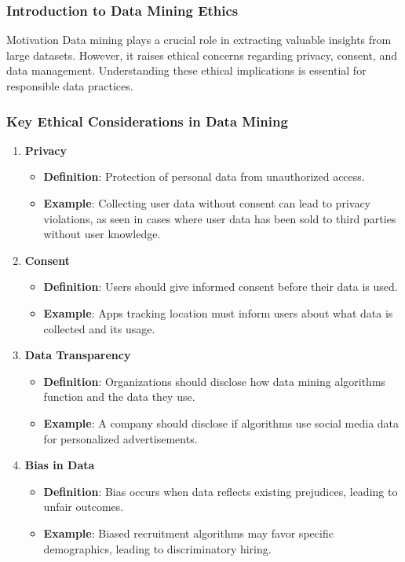 \documentclass[aspectratio=169]{beamer}
\begin{document}
\begin{frame}[fragile]
    \frametitle{Introduction to Data Mining Ethics}
    \begin{block}{Motivation}
        Data mining plays a crucial role in extracting valuable insights from large datasets. However, it raises ethical concerns regarding privacy, consent, and data management. Understanding these ethical implications is essential for responsible data practices.
    \end{block}
\end{frame}

\begin{frame}[fragile]
    \frametitle{Key Ethical Considerations in Data Mining}
    \begin{enumerate}
        \item \textbf{Privacy}
            \begin{itemize}
                \item \textbf{Definition}: Protection of personal data from unauthorized access.
                \item \textbf{Example}: Collecting user data without consent can lead to privacy violations, as seen in cases where user data has been sold to third parties without user knowledge.
            \end{itemize}
        \item \textbf{Consent}
            \begin{itemize}
                \item \textbf{Definition}: Users should give informed consent before their data is used.
                \item \textbf{Example}: Apps tracking location must inform users about what data is collected and its usage.
            \end{itemize}
        \item \textbf{Data Transparency}
            \begin{itemize}
                \item \textbf{Definition}: Organizations should disclose how data mining algorithms function and the data they use.
                \item \textbf{Example}: A company should disclose if algorithms use social media data for personalized advertisements.
            \end{itemize}
        \item \textbf{Bias in Data}
            \begin{itemize}
                \item \textbf{Definition}: Bias occurs when data reflects existing prejudices, leading to unfair outcomes.
                \item \textbf{Example}: Biased recruitment algorithms may favor specific demographics, leading to discriminatory hiring.
            \end{itemize}
    \end{enumerate}
\end{frame}
\end{document}

